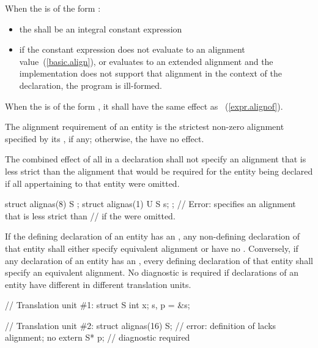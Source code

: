 \pnum
When the  is of the form
  \tcode{)}:

\begin{itemize}
\item the  shall be an integral constant expression

\item if the constant expression does not evaluate to an alignment
value~(\ref{basic.align}), or evaluates to an extended alignment and
the implementation does not support that alignment in the context of the
declaration, the program is ill-formed.
\end{itemize}

\pnum
When the  is of the form
  \tcode{)}, it shall have the same
effect as \tcode{))}~(\ref{expr.alignof}).

\pnum
The alignment requirement of an entity is the strictest non-zero alignment
specified by its , if any;
otherwise, the  have no effect.

\pnum
The combined effect of all  in a declaration shall not
specify an alignment that is less strict than the alignment that would
be required for the entity being declared if all 
appertaining to that entity
were omitted.
\enterexample
\begin{codeblock}
struct alignas(8) S {};
struct alignas(1) U {
  S s;
};   // Error:  specifies an alignment that is less strict than
     // if the  were omitted.
\end{codeblock}
\exitexample

\pnum
If the defining declaration of an entity has an
, any non-defining
declaration of that entity shall either specify equivalent alignment or have no
.
Conversely, if any declaration of an entity has an
,
every defining
declaration of that entity shall specify an equivalent alignment.
No diagnostic is required if declarations of an entity have
different 
in different translation units.

\enterexample
\begin{codeblock}
// Translation unit \#1:
struct S { int x; } s, p = &s;

// Translation unit \#2:
struct alignas(16) S;           // error: definition of  lacks alignment; no
extern S* p;                    // diagnostic required
\end{codeblock}
\exitexample

